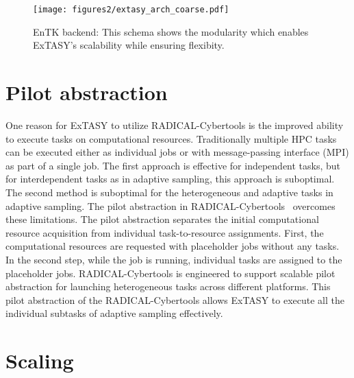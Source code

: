 {\begin{figure}[H]
 \centering
  \texttt{[image: figures2/extasy\_arch\_coarse.pdf]}
  \caption{EnTK backend: This schema shows the modularity which enables ExTASY's scalability while ensuring flexibity.  
  }\label{fig:extasy_arch}
\end{figure}


\section{Pilot abstraction} 
One reason for ExTASY to utilize RADICAL-Cybertools is the improved ability to execute tasks on computational resources. Traditionally multiple HPC tasks can be executed either as individual jobs or with message-passing interface (MPI) as part of a single job. The first approach is effective for independent tasks, but for interdependent tasks as in adaptive sampling, this approach is suboptimal. The second method is suboptimal for the heterogeneous and adaptive tasks in adaptive sampling. The pilot abstraction in RADICAL-Cybertools~\cite{turilli2018comprehensive} overcomes these limitations.  The pilot abstraction separates the initial computational resource acquisition from individual task-to-resource assignments. First, the computational resources are requested with placeholder jobs without any tasks. In the second step, while the job is running, individual tasks are assigned to the placeholder jobs. RADICAL-Cybertools is engineered to support scalable pilot abstraction for launching heterogeneous tasks across different platforms. This pilot abstraction of the RADICAL-Cybertools allows ExTASY to execute all the individual subtasks of adaptive sampling effectively.  

\section{\label{sec:scaling}Scaling}


}
